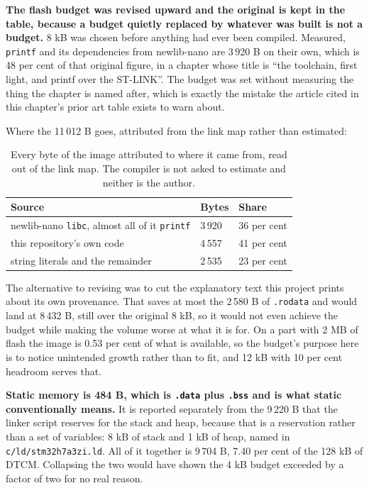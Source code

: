\textbf{The flash budget was revised upward and the original is kept in the table,
because a budget quietly replaced by whatever was built is not a budget.} 8 kB was
chosen before anything had ever been compiled. Measured, \texttt{printf} and its
dependencies from newlib-nano are 3\,920 B on their own, which is 48 per cent of
that original figure, in a chapter whose title is ``the toolchain, first light, and
printf over the ST-LINK''. The budget was set without measuring the thing the
chapter is named after, which is exactly the mistake the article cited in this
chapter's prior art table exists to warn about.

Where the 11\,012 B goes, attributed from the link map rather than estimated:

\begin{table}[H]\centering\small
\begin{tabular}{p{74mm}p{24mm}p{24mm}}
\toprule
Source & Bytes & Share \\
\midrule
newlib-nano \texttt{libc}, almost all of it \texttt{printf} & 3\,920 & 36 per cent \\
this repository's own code & 4\,557 & 41 per cent \\
string literals and the remainder & 2\,535 & 23 per cent \\
\bottomrule
\end{tabular}
\caption{Every byte of the image attributed to where it came from, read out of the
link map. The compiler is not asked to estimate and neither is the author.}
\end{table}

The alternative to revising was to cut the explanatory text this project prints
about its own provenance. That saves at most the 2\,580 B of \texttt{.rodata} and
would land at 8\,432 B, still over the original 8 kB, so it would not even achieve
the budget while making the volume worse at what it is for. On a part with 2 MB of
flash the image is 0.53 per cent of what is available, so the budget's purpose here
is to notice unintended growth rather than to fit, and 12 kB with 10 per cent
headroom serves that.

\textbf{Static memory is 484 B, which is \texttt{.data} plus \texttt{.bss} and is
what static conventionally means.} It is reported separately from the 9\,220 B that
the linker script reserves for the stack and heap, because that is a reservation
rather than a set of variables: 8 kB of stack and 1 kB of heap, named in
\texttt{c/ld/stm32h7a3zi.ld}. All of it together is 9\,704 B, 7.40 per cent of the
128 kB of DTCM. Collapsing the two would have shown the 4 kB budget exceeded by a
factor of two for no real reason.

